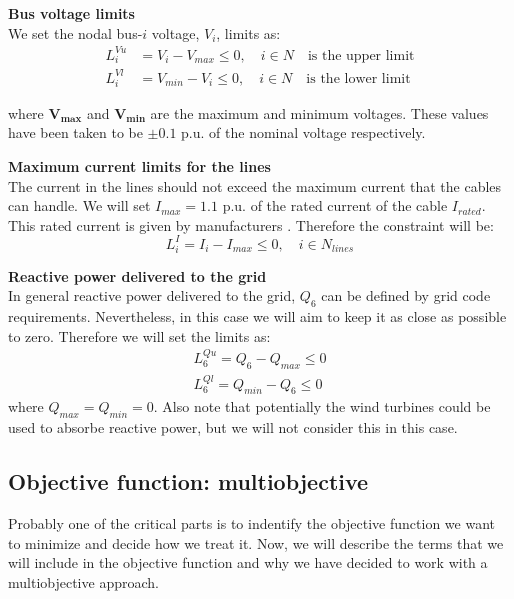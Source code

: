 \documentclass[a4paper,11pt, titlepage, twoside]{article}
\begin{document}
\textbf{Bus voltage limits}\\
We set the nodal bus-$i$ voltage, $V_i$, limits as:
\begin{equation}
\begin{aligned}
    L_{i}^{Vu} &= V_i - V_{max} \leq 0, \quad i \in N \quad \text{is the upper limit} \\
    L_{i}^{Vl} &= V_{min} - V_i \leq 0, \quad i \in N \quad \text{is the lower limit}   
\end{aligned}    
\end{equation}

where $\mathbf{V_{max}}$ and $\mathbf{V_{min}}$ are the maximum and minimum voltages. These values have been taken to be $\pm 0.1$ p.u. of the nominal voltage respectively.

\textbf{Maximum current limits for the lines}\\
The current in the lines should not exceed the maximum current that the cables can handle. We will set $I_{max} = 1.1$ p.u. of the rated current of the cable $I_{rated}$. This rated current is given by manufacturers \cite{ABB}.
Therefore the constraint will be:
\begin{equation}
    L_{i}^{I} = I_i - I_{max} \leq 0, \quad i \in N_{lines}
\end{equation}

\textbf{Reactive power delivered to the grid}\\
In general reactive power delivered to the grid, $Q_6$ can be defined by grid code requirements. Nevertheless, in this case we will aim to keep it as close as
possible to zero. Therefore we will set the limits as:
\begin{equation}
\begin{aligned}
    L_{6}^{Qu} = Q_6 - Q_{max} \leq 0 \\
    L_{6}^{Ql} = Q_{min} - Q_{6} \leq 0
\end{aligned}
\end{equation}
where $Q_{max}=Q_{min}=0$. Also note that potentially the wind turbines could be used to absorbe reactive power, but we will not consider this in this case.


\subsection{Objective function: multiobjective}\label{objfun}

Probably one of the critical parts is to indentify the objective function we want to minimize and decide how we treat it. Now, we will describe the terms that we will include in the objective function
and why we have decided to work with a multiobjective approach.\par
\end{document}
